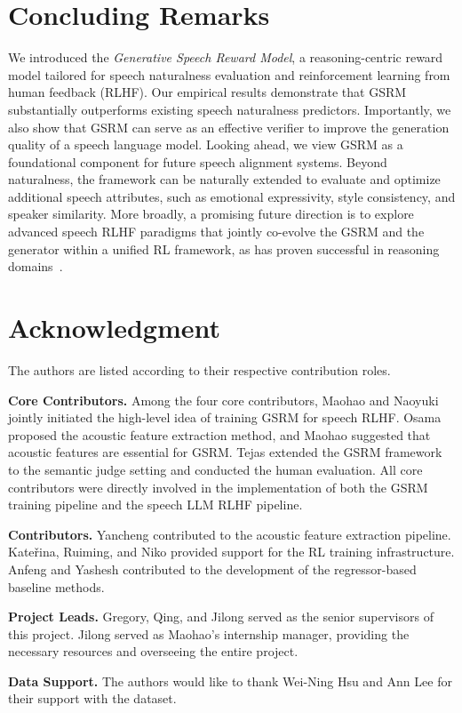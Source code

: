 \section{Concluding Remarks}
We introduced the \emph{Generative Speech Reward Model}, a reasoning-centric reward model tailored for speech naturalness evaluation and reinforcement learning from human feedback (RLHF). Our empirical results demonstrate that GSRM substantially outperforms existing speech naturalness predictors. Importantly, we also show that GSRM can serve as an effective verifier to improve the generation quality of a speech language model. Looking ahead, we view GSRM as a foundational component for future speech alignment systems. Beyond naturalness, the framework can be naturally extended to evaluate and optimize additional speech attributes, such as emotional expressivity, style consistency, and speaker similarity. More broadly, a promising future direction is to explore advanced speech RLHF paradigms that jointly co-evolve the GSRM and the generator within a unified RL framework, as has proven successful in reasoning domains~\cite{zha2025rl}.


\section*{Acknowledgment}
The authors are listed according to their respective contribution roles.

\textbf{Core Contributors.}
Among the four core contributors, Maohao and Naoyuki jointly initiated the high-level idea of training GSRM for speech RLHF. Osama proposed the acoustic feature extraction method, and Maohao suggested that acoustic features are essential for GSRM. Tejas extended the GSRM framework to the semantic judge setting and conducted the human evaluation. All core contributors were directly involved in the implementation of both the GSRM training pipeline and the speech LLM RLHF pipeline.

\textbf{Contributors.}
Yancheng contributed to the acoustic feature extraction pipeline. Kateřina, Ruiming, and Niko provided support for the RL training infrastructure. Anfeng and Yashesh contributed to the development of the regressor-based baseline methods.

\textbf{Project Leads.}
Gregory, Qing, and Jilong served as the senior supervisors of this project. Jilong served as Maohao’s internship manager, providing the necessary resources and overseeing the entire project.

\textbf{Data Support.}
The authors would like to thank Wei-Ning Hsu and Ann Lee for their support with the dataset.